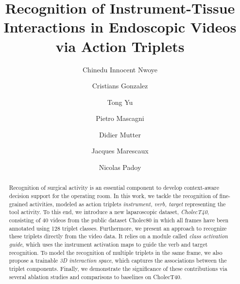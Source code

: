 \documentclass[english,runningheads,a4paper]{llncs}
\begin{document}
\title{Recognition of Instrument-Tissue Interactions in Endoscopic Videos via Action Triplets}

\author{Chinedu Innocent Nwoye \and Cristians Gonzalez
\and Tong Yu
\and Pietro Mascagni 
\and Didier Mutter 
\and Jacques Marescaux
\and Nicolas Padoy}





\urldef{\mailsa}





\maketitle              \begin{abstract}
Recognition of surgical activity is an essential component to develop context-aware decision support for the operating room. 
In this work, we tackle the recognition of fine-grained activities, modeled as action triplets \textlangle{}\textit{instrument, verb, target}\textrangle{} representing the tool activity. 
To this end, we introduce a new laparoscopic dataset, \textit{CholecT40}, consisting of 40 videos from the public dataset Cholec80 in which all frames have been annotated using 128 triplet classes. 
Furthermore, we present an approach to recognize these triplets directly from the video data. 
It relies on a module called {\it class activation guide}, which uses the instrument activation maps to guide the verb and target recognition. 
To model the recognition of multiple triplets in the same frame, we also propose a trainable {\it 3D interaction space}, which captures the associations between the triplet components. 
Finally, we demonstrate the significance of these contributions via several ablation studies and comparisons to baselines on CholecT40.  

\end{abstract}
\end{document}
